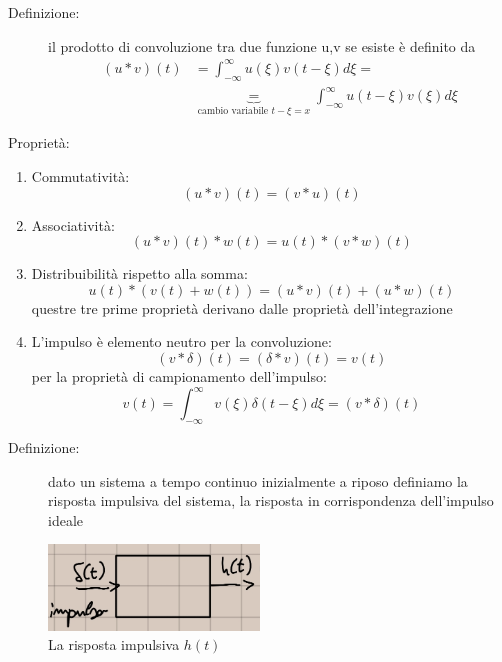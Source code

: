 \documentclass[a4paper, 12pt]{book}
\theoremstyle{plain}
\begin{document}
\begin{description}
    \item[Definizione:] il prodotto di convoluzione tra due funzione u,v se esiste è definito da \[\begin{split}
        (u \ast v)(t) &= \int_{-\infty}^\infty u(\xi)v(t - \xi)d\xi = \\
        &\underbrace{=}_{\textrm{cambio variabile } t - \xi = x} \int_{-\infty}^\infty u(t - \xi)v(\xi)d\xi 
    \end{split}\] 
\end{description}

Proprietà:
\begin{enumerate}
    \item Commutatività: \[(u \ast v)(t) = (v \ast u)(t)\]
    \item Associatività: \[(u \ast v)(t) \ast w(t) = u(t) \ast (v \ast w)(t)\]
    \item Distribuibilità rispetto alla somma: \[u(t) \ast (v(t) + w(t)) = (u \ast v)(t) + (u \ast w)(t)\] questre tre prime proprietà derivano dalle proprietà dell'integrazione
    \item L'impulso è elemento neutro per la convoluzione: \[(v \ast \delta)(t) = (\delta \ast v)(t) = v(t)\] per la proprietà di campionamento dell'impulso: \[v(t) = \int_{-\infty}^\infty v(\xi)\delta(t - \xi)d\xi = (v \ast \delta)(t)\] 
\end{enumerate}

\begin{description}
    \item[Definizione:] dato un sistema a tempo continuo inizialmente a riposo definiamo la risposta impulsiva del sistema, la risposta in corrispondenza dell'impulso ideale 
\end{description}

\begin{figure}
    \includegraphics[width=0.5\textwidth]{risposta_impulsiva.jpg}
    \caption{La risposta impulsiva $h(t)$}
\end{figure}
\end{document}
